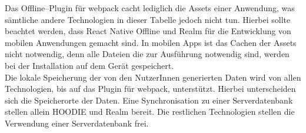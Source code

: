 %
%
%
Das Offline--Plugin für webpack cacht lediglich die \gls{Assets} einer Anwendung, was sämtliche andere Technologien in dieser Tabelle jedoch nicht tun.
Hierbei sollte beachtet werden, dass React Native Offline und Realm für die Entwicklung von mobilen Anwendungen gemacht sind.
In mobilen \glspl{App} ist das Cachen der \gls{Assets} nicht notwendig, denn alle Dateien die zur Ausführung notwendig sind, werden bei der Installation auf dem Gerät gespeichert.\\
Die lokale Speicherung der von den NutzerInnen generierten Daten wird von allen Technologien, bis auf das Plugin für webpack, unterstützt.
Hierbei unterscheiden sich die Speicherorte der Daten.
Eine Synchronisation zu einer Serverdatenbank stellen allein HOODIE und Realm bereit.
Die restlichen Technologien stellen die Verwendung einer Serverdatenbank frei.